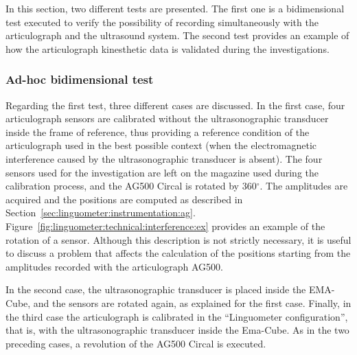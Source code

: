

In this section, two different tests are presented. The first one is a
bidimensional test executed to verify the possibility of
recording  simultaneously with the articulograph and the ultrasound system.
The second test provides an example of how the articulograph kinesthetic data is
validated during the investigations.

\subsubsection{Ad-hoc bidimensional test}
Regarding the first test, three different cases are discussed.
In the first case, four articulograph sensors are calibrated without the 
ultrasonographic transducer inside the frame of reference, thus
providing a reference condition of the articulograph used in the best
possible context (when the electromagnetic interference caused by the
ultrasonographic transducer is absent).
The four sensors used for the investigation are left on the magazine used during
the calibration process, and the AG500 Circal is rotated by 360$^{\circ}$.
The amplitudes are acquired and the positions are computed as described in
Section~\ref{sec:linguometer:instrumentation:ag}.
Figure~\ref{fig:linguometer:technical:interference:ex} provides an example
of the rotation of a sensor.
Although this description is not strictly necessary, it is useful to 
discuss a problem that affects the 
calculation of the positions starting from the amplitudes recorded with the
articulograph AG500.


In the second case, the ultrasonographic transducer is placed inside the
EMA-Cube, and the sensors are rotated again, as explained for the first case.
Finally, in the third case the articulograph is calibrated in the ``Linguometer
configuration'', that is, with the ultrasonographic transducer inside the
Ema-Cube.
As in the two preceding cases, a revolution of the AG500 Circal is executed.

